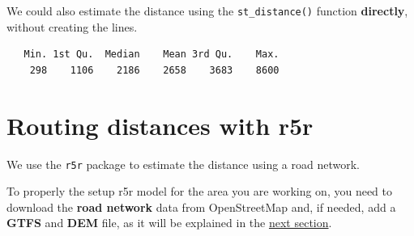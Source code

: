 \documentclass[
  letterpaper,
  DIV=11,
  numbers=noendperiod]{scrreprt}
\newenvironment{Shaded}{\begin{snugshade}}{\end{snugshade}}
\newcommand{\AttributeTok}[1]{\textcolor[rgb]{0.40,0.45,0.13}{#1}}
\newcommand{\CommentTok}[1]{\textcolor[rgb]{0.37,0.37,0.37}{#1}}
\newcommand{\DecValTok}[1]{\textcolor[rgb]{0.68,0.00,0.00}{#1}}
\newcommand{\FunctionTok}[1]{\textcolor[rgb]{0.28,0.35,0.67}{#1}}
\newcommand{\NormalTok}[1]{\textcolor[rgb]{0.00,0.23,0.31}{#1}}
\newcommand{\OtherTok}[1]{\textcolor[rgb]{0.00,0.23,0.31}{#1}}
\newcommand{\SpecialCharTok}[1]{\textcolor[rgb]{0.37,0.37,0.37}{#1}}
\begin{document}
We could also estimate the distance using the \texttt{st\_distance()}
function \textbf{directly}, without creating the lines.

\begin{Shaded}
\end{Shaded}

\begin{verbatim}
   Min. 1st Qu.  Median    Mean 3rd Qu.    Max. 
    298    1106    2186    2658    3683    8600 
\end{verbatim}

\section{Routing distances with r5r}\label{routing-distances-with-r5r}

We use the \texttt{r5r} package to estimate the distance using a road
network.

\begin{tcolorbox}[enhanced jigsaw, breakable, left=2mm, colframe=quarto-callout-note-color-frame, leftrule=.75mm, bottomrule=.15mm, arc=.35mm, rightrule=.15mm, colback=white, opacityback=0, toprule=.15mm]
\begin{minipage}[t]{5.5mm}
\textcolor{quarto-callout-note-color}{\faInfo}
\end{minipage}%
\begin{minipage}[t]{\textwidth - 5.5mm}

To properly the setup r5r model for the area you are working on, you
need to download the \textbf{road network} data from OpenStreetMap and,
if needed, add a \textbf{GTFS} and \textbf{DEM} file, as it will be
explained in the \href{r5r.qmd}{next section}.

\end{minipage}%
\end{tcolorbox}
\end{document}
